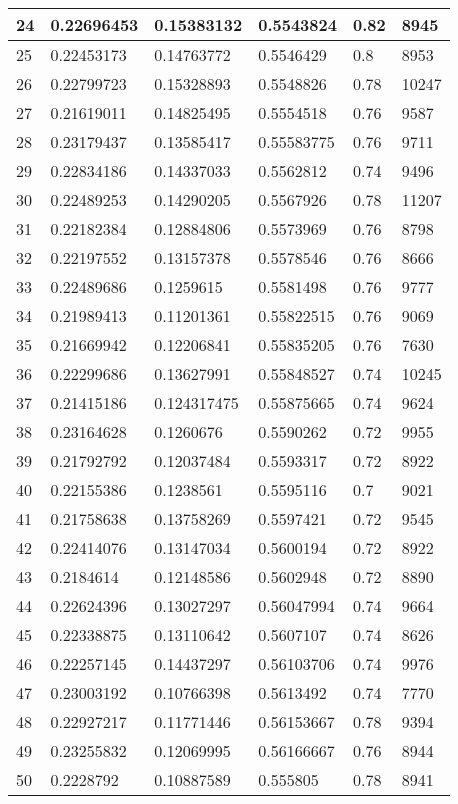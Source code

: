 \begin{longtable}{|l|l|l|l|l|l|}
24 & 0.22696453 & 0.15383132 & 0.5543824 & 0.82 & 8945 \\ \hline 
25 & 0.22453173 & 0.14763772 & 0.5546429 & 0.8 & 8953 \\ \hline 
26 & 0.22799723 & 0.15328893 & 0.5548826 & 0.78 & 10247 \\ \hline 
27 & 0.21619011 & 0.14825495 & 0.5554518 & 0.76 & 9587 \\ \hline 
28 & 0.23179437 & 0.13585417 & 0.55583775 & 0.76 & 9711 \\ \hline 
29 & 0.22834186 & 0.14337033 & 0.5562812 & 0.74 & 9496 \\ \hline 
30 & 0.22489253 & 0.14290205 & 0.5567926 & 0.78 & 11207 \\ \hline 
31 & 0.22182384 & 0.12884806 & 0.5573969 & 0.76 & 8798 \\ \hline 
32 & 0.22197552 & 0.13157378 & 0.5578546 & 0.76 & 8666 \\ \hline 
33 & 0.22489686 & 0.1259615 & 0.5581498 & 0.76 & 9777 \\ \hline 
34 & 0.21989413 & 0.11201361 & 0.55822515 & 0.76 & 9069 \\ \hline 
35 & 0.21669942 & 0.12206841 & 0.55835205 & 0.76 & 7630 \\ \hline 
36 & 0.22299686 & 0.13627991 & 0.55848527 & 0.74 & 10245 \\ \hline 
37 & 0.21415186 & 0.124317475 & 0.55875665 & 0.74 & 9624 \\ \hline 
38 & 0.23164628 & 0.1260676 & 0.5590262 & 0.72 & 9955 \\ \hline 
39 & 0.21792792 & 0.12037484 & 0.5593317 & 0.72 & 8922 \\ \hline 
40 & 0.22155386 & 0.1238561 & 0.5595116 & 0.7 & 9021 \\ \hline 
41 & 0.21758638 & 0.13758269 & 0.5597421 & 0.72 & 9545 \\ \hline 
42 & 0.22414076 & 0.13147034 & 0.5600194 & 0.72 & 8922 \\ \hline 
43 & 0.2184614 & 0.12148586 & 0.5602948 & 0.72 & 8890 \\ \hline 
44 & 0.22624396 & 0.13027297 & 0.56047994 & 0.74 & 9664 \\ \hline 
45 & 0.22338875 & 0.13110642 & 0.5607107 & 0.74 & 8626 \\ \hline 
46 & 0.22257145 & 0.14437297 & 0.56103706 & 0.74 & 9976 \\ \hline 
47 & 0.23003192 & 0.10766398 & 0.5613492 & 0.74 & 7770 \\ \hline 
48 & 0.22927217 & 0.11771446 & 0.56153667 & 0.78 & 9394 \\ \hline 
49 & 0.23255832 & 0.12069995 & 0.56166667 & 0.76 & 8944 \\ \hline 
50 & 0.2228792 & 0.10887589 & 0.555805 & 0.78 & 8941 \\ \hline 
\end{longtable}